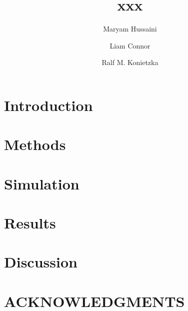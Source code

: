 \documentclass[onecolumn]{aastex631}
\begin{document}
\title{xxx}

\author[0000-0001-9580-1043]{Maryam Hussaini}

\author[0000-0002-7587-6352]{Liam Connor}

\author[0000-0001-8235-2939]{Ralf M. Konietzka}


\begin{abstract}

\end{abstract}


\section{Introduction}
\label{sec:intro}


\section{Methods}
\label{sec:methods}

\section{Simulation}
\label{sec:data}

\section{Results}
\label{sec:results}

\section{Discussion}
\label{sec:discussion}

\section{ACKNOWLEDGMENTS}

\clearpage


\end{document}
